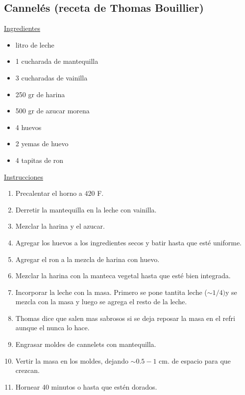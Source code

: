 \subsection{Cannelés (receta de Thomas Bouillier)}
\underline{Ingredientes}
\begin{itemize}
\item litro de leche
\item 1 cucharada de mantequilla
\item 3 cucharadas de vainilla
\item 250 gr de harina
\item 500 gr de azucar morena
\item 4 huevos
\item 2 yemas de huevo
\item 4 tapitas de ron 


\end{itemize}

\underline{Instrucciones}

\begin{enumerate}
\item Precalentar el horno a $420$ F. 
\item Derretir la mantequilla en la leche con vainilla.
\item Mezclar la harina y el azucar.
\item Agregar los huevos a los ingredientes secos y batir hasta que esté uniforme.
\item Agregar el ron a la mezcla de harina con huevo. 
\item Mezclar la harina con la manteca vegetal hasta que esté bien integrada. 
\item Incorporar la leche con la masa. Primero se pone tantita leche ($\sim 1/4)$y se mezcla con la masa y luego se agrega el resto de la leche. 
\item Thomas dice que salen mas sabrosos si se deja reposar la masa en el refri aunque el nunca lo hace.
\item Engrasar moldes de cannelets con mantequilla. 
\item Vertir la masa en los moldes, dejando $\sim 0.5-1$ cm. de espacio para que crezcan.
\item Hornear 40 minutos o hasta que estén dorados. 
\end{enumerate}
